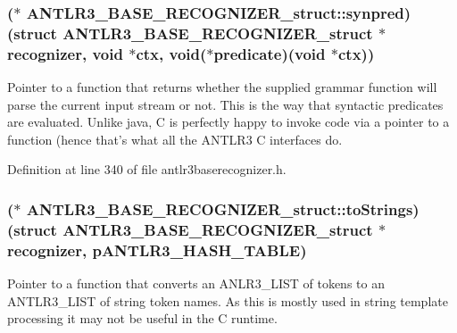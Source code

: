 \hypertarget{struct_a_n_t_l_r3___b_a_s_e___r_e_c_o_g_n_i_z_e_r__struct_a23043c23667935185fe939d5fa2f445b}{
\subsubsection[{synpred}]{($\ast$ A\-N\-T\-L\-R3\-\_\-\-B\-A\-S\-E\-\_\-\-R\-E\-C\-O\-G\-N\-I\-Z\-E\-R\-\_\-struct\-::synpred)(struct {\bf A\-N\-T\-L\-R3\-\_\-\-B\-A\-S\-E\-\_\-\-R\-E\-C\-O\-G\-N\-I\-Z\-E\-R\-\_\-struct} $\ast${\bf recognizer}, void $\ast$ctx, void($\ast$predicate)(void $\ast$ctx))}}\label{struct_a_n_t_l_r3___b_a_s_e___r_e_c_o_g_n_i_z_e_r__struct_a23043c23667935185fe939d5fa2f445b}
Pointer to a function that returns whether the supplied grammar function will parse the current input stream or not. This is the way that syntactic predicates are evaluated. Unlike java, C is perfectly happy to invoke code via a pointer to a function (hence that's what all the A\-N\-T\-L\-R3 C interfaces do. 

Definition at line 340 of file antlr3baserecognizer.\-h.

\hypertarget{struct_a_n_t_l_r3___b_a_s_e___r_e_c_o_g_n_i_z_e_r__struct_ad052b4722fdca6e73414726da5f0b9b9}{
\subsubsection[{to\-Strings}]{($\ast$ A\-N\-T\-L\-R3\-\_\-\-B\-A\-S\-E\-\_\-\-R\-E\-C\-O\-G\-N\-I\-Z\-E\-R\-\_\-struct\-::to\-Strings)(struct {\bf A\-N\-T\-L\-R3\-\_\-\-B\-A\-S\-E\-\_\-\-R\-E\-C\-O\-G\-N\-I\-Z\-E\-R\-\_\-struct} $\ast${\bf recognizer}, {\bf p\-A\-N\-T\-L\-R3\-\_\-\-H\-A\-S\-H\-\_\-\-T\-A\-B\-L\-E})}}\label{struct_a_n_t_l_r3___b_a_s_e___r_e_c_o_g_n_i_z_e_r__struct_ad052b4722fdca6e73414726da5f0b9b9}
Pointer to a function that converts an A\-N\-L\-R3\-\_\-\-L\-I\-S\-T of tokens to an A\-N\-T\-L\-R3\-\_\-\-L\-I\-S\-T of string token names. As this is mostly used in string template processing it may not be useful in the C runtime. 

